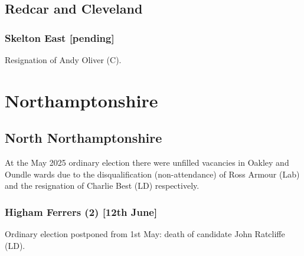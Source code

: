 \documentclass[a4paper,openany]{book}
\begin{document}
\begin{resultsiii}
\subsection*{Redcar and Cleveland}

\subsubsection*{Skelton East \hspace*{\fill}\nolinebreak[1]%
	\enspace\hspace*{\fill}
	[pending]}


Resignation of Andy Oliver (C).

\section{Northamptonshire}

\subsection*{North Northamptonshire}

At the May 2025 ordinary election there were unfilled vacancies in Oakley and Oundle wards due to the disqualification (non-attendance) of Ross Armour (Lab) and the resignation of Charlie Best (LD) respectively.%

\subsubsection*{Higham Ferrers (2) \hspace*{\fill}\nolinebreak[1]%
	\enspace\hspace*{\fill}
	[12th June]}


Ordinary election postponed from 1st May: death of candidate John Ratcliffe (LD).


\end{resultsiii}
\end{document}
